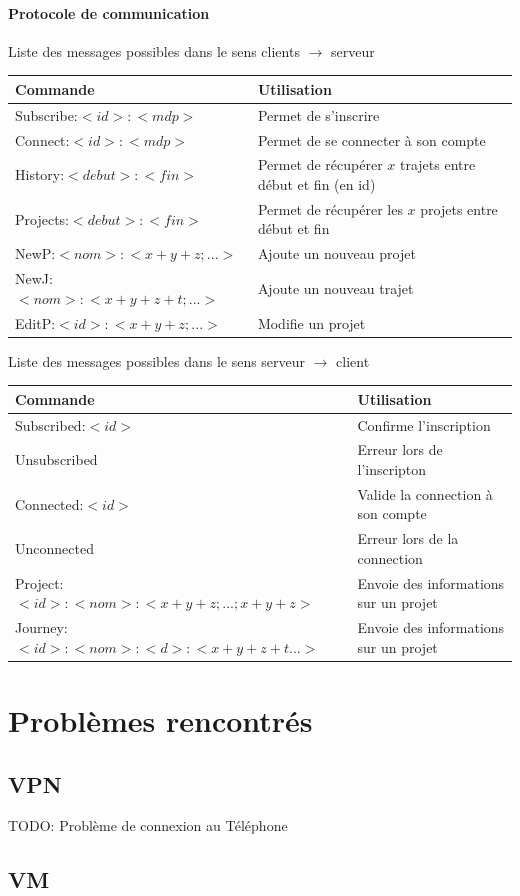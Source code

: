 \documentclass[a4paper, 12pt]{report}
\begin{document}
		\subsubsection{Protocole de communication}
			\begin{center}
				Liste des messages possibles dans le sens clients $\rightarrow$ serveur
				\par
				\begin{tabular}{|l|l|}
					\hline
					Commande & Utilisation\\
					\hline
					Subscribe:$<id>:<mdp>$ & Permet de s'inscrire\\
					\hline
					Connect:$<id>:<mdp>$ & Permet de se connecter à son compte\\
					\hline
					\hline
					History:$<debut>:<fin>$ & Permet de récupérer $x$ trajets entre début et fin (en id)\\
					\hline
					Projects:$<debut>:<fin>$ & Permet de récupérer les $x$ projets entre début et fin\\
					\hline
					\hline
					NewP:$<nom>:<x+y+z;...>$ & Ajoute un nouveau projet\\
					\hline
					NewJ:$<nom>:<x+y+z+t;...>$ & Ajoute un nouveau trajet\\
					\hline
					EditP:$<id>:<x+y+z;...>$ & Modifie un projet\\
					\hline
				\end{tabular}
			\end{center}
			\begin{center}
				Liste des messages possibles dans le sens serveur $\rightarrow$ client
				\par
				\begin{tabular}{|l|l|}
					\hline
					Commande & Utilisation\\
					\hline
					Subscribed:$<id>$ & Confirme l'inscription \\
					\hline
					Unsubscribed & Erreur lors de l'inscripton \\
					\hline
					Connected:$<id>$ & Valide la connection à son compte\\
					\hline
					Unconnected & Erreur lors de la connection \\
					\hline
					\hline
					Project:$<id>:<nom>:<x+y+z;...;x+y+z>$ & Envoie des informations sur un projet\\
					\hline
					Journey:$<id>:<nom>:<d>:<x+y+z+t...>$ & Envoie des informations sur un projet\\
					\hline
				\end{tabular}
			\end{center}
\chapter{Problèmes rencontrés}
\section{VPN}
	TODO: Problème de connexion au Téléphone
\section{VM}
\end{document}
